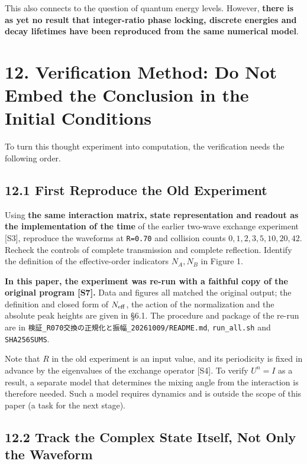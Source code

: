 \documentclass[
  a4paper,
]{article}
\begin{document}
This also connects to the question of quantum energy levels. However,
\textbf{there is as yet no result that integer-ratio phase locking,
discrete energies and decay lifetimes have been reproduced from the same
numerical model}.

\section{12. Verification Method: Do Not Embed the Conclusion in the
Initial
Conditions}\label{verification-method-do-not-embed-the-conclusion-in-the-initial-conditions}

To turn this thought experiment into computation, the verification needs
the following order.

\subsection{12.1 First Reproduce the Old
Experiment}\label{first-reproduce-the-old-experiment}

Using \textbf{the same interaction matrix, state representation and
readout as the implementation of the time} of the earlier two-wave
exchange experiment {[}S3{]}, reproduce the waveforms at \texttt{R=0.70}
and collision counts \(0,1,2,3,5,10,20,42\). Recheck the controls of
complete transmission and complete reflection. Identify the definition
of the effective-order indicators \(N_A,N_B\) in Figure 1.

\textbf{In this paper, the experiment was re-run with a faithful copy of
the original program {[}S7{]}.} Data and figures all matched the
original output; the definition and closed form of \(N_{\rm eff}\), the
action of the normalization and the absolute peak heights are given in
§6.1. The procedure and package of the re-run are in
\texttt{検証\_\allowbreak{}R070交換の正規化と振幅\_\allowbreak{}20261009/\allowbreak{}README.md},
\texttt{run\_\allowbreak{}all.sh} and \texttt{SHA256SUMS}.

Note that \(R\) in the old experiment is an input value, and its
periodicity is fixed in advance by the eigenvalues of the exchange
operator {[}S4{]}. To verify \(U^n=I\) as a result, a separate model
that determines the mixing angle from the interaction is therefore
needed. Such a model requires dynamics and is outside the scope of this
paper (a task for the next stage).

\subsection{12.2 Track the Complex State Itself, Not Only the
Waveform}\label{track-the-complex-state-itself-not-only-the-waveform}
\end{document}
